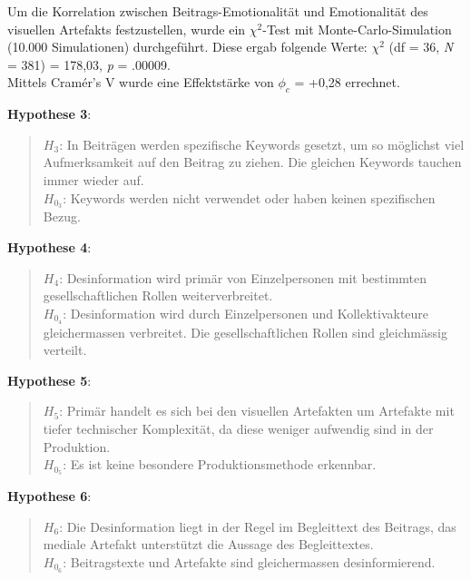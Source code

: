 \documentclass[12pt,a4paper]{article}        %
\begin{document}
Um die Korrelation zwischen Beitrags-Emotionalität und Emotionalität des visuellen Artefakts festzustellen,  wurde ein \(\chi^2\)-Test mit Monte-Carlo-Simulation (10.000 Simulationen) durchgeführt. Diese ergab folgende Werte: \(\chi^2\) (df = 36, \textit{N} = 381) = 178,03, \textit{p} = .00009.\\
Mittels Cramér's V wurde eine Effektstärke von \(\phi_c\) = +0,28 errechnet. %

\textbf{Hypothese 3}:
\begin{quote}
  \(H_3\): In Beiträgen werden spezifische Keywords gesetzt, um so möglichst viel Aufmerksamkeit auf den Beitrag zu ziehen. Die gleichen Keywords tauchen immer wieder auf.\\
  \(H_{0_3}\): Keywords werden nicht verwendet oder haben keinen spezifischen Bezug.
\end{quote}

\textbf{Hypothese 4}:
\begin{quote}
  \(H_4\): Desinformation wird primär von Einzelpersonen mit bestimmten gesellschaftlichen Rollen weiterverbreitet.\\
  \(H_{0_4}\): Desinformation wird durch Einzelpersonen und Kollektivakteure gleichermassen verbreitet. Die gesellschaftlichen Rollen sind gleichmässig verteilt.
\end{quote}

\textbf{Hypothese 5}:
\begin{quote}
  \(H_5\): Primär handelt es sich bei den visuellen Artefakten um Artefakte mit tiefer technischer Komplexität, da diese weniger aufwendig sind in der Produktion.\\
  \(H_{0_5}\): Es ist keine besondere Produktionsmethode erkennbar.
\end{quote}

\textbf{Hypothese 6}:
\begin{quote}
  \(H_6\): Die Desinformation liegt in der Regel im Begleittext des Beitrags, das mediale Artefakt unterstützt die Aussage des Begleittextes. \\
  \(H_{0_6}\): Beitragstexte und Artefakte sind gleichermassen desinformierend.
\end{quote}
\end{document}
